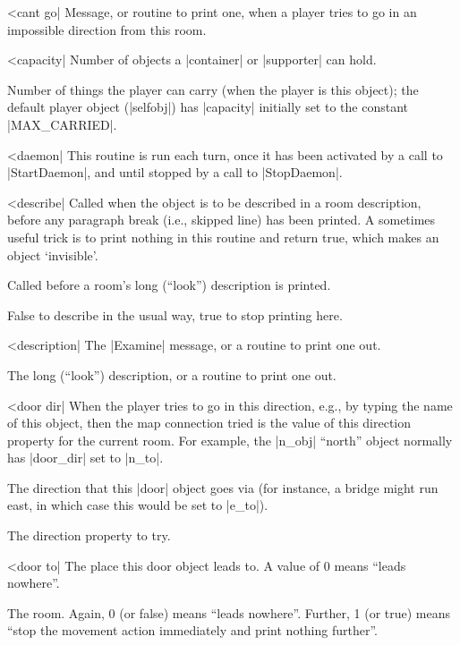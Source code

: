^^|cant go|
\fr Message, or routine to print one, when a player tries to go in an
impossible direction from this room.

\nrr

^^|capacity|
\fo Number of objects a |container| or |supporter|
can hold.

\fpo Number of things the player can carry (when the player is this
object); the default player object (|selfobj|) has |capacity| initially
set to the constant |MAX_CARRIED|.

^^|daemon|
This routine is run each turn, once it has been activated by a
call to |StartDaemon|, and until stopped by a call to |StopDaemon|.

^^|describe|
\fo Called when the object is to be described in a room description,
before any paragraph break (i.e., skipped line) has been printed.  A
sometimes useful trick is to print nothing in this routine and return
true, which makes an object `invisible'.

\fr Called before a room's long (``look'') description is printed.

\rr False to describe in the usual way, true to stop printing here.

^^|description|
\fo The |Examine| message, or a routine to print one out.

\fr The long (``look'') description, or a routine to print one out.

\nrr

^^|door dir|
\fco When the player tries to go in this direction, e.g., by typing the
name of this object, then the map connection tried is the value of
this direction property for the current room.  For example, the
|n_obj| ``north'' object normally has |door_dir| set to |n_to|.

\fo The direction that this |door| object goes via (for instance,
a bridge might run east, in which case this would be set to |e_to|).

\rr The direction property to try.

^^|door to|
\fo The place this door object leads to.  A value of 0 means
``leads nowhere''.

\rr The room.  Again, 0 (or false) means ``leads nowhere''.
Further, 1 (or true) means ``stop the movement action immediately
and print nothing further''.

